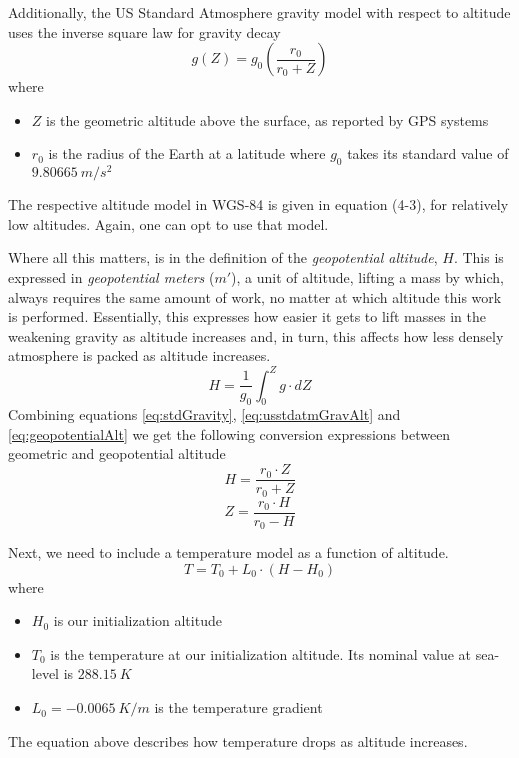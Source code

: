 Additionally, the US Standard Atmosphere gravity model with respect to altitude uses the inverse square law for gravity decay
\begin{equation} \label{eq:usstdatmGravAlt}
	g(Z) = g_0 \left(\frac{r_0}{r_0+Z}\right)
\end{equation}
where
\begin{itemize}
	\item $Z$ is the geometric altitude above the surface, as reported by GPS systems
	\item $r_0$ is the radius of the Earth at a latitude where $g_0$ takes its standard value of $9.80665~ m/s^2$
\end{itemize}
The respective altitude model in WGS-84 is given in equation (4-3), for relatively low altitudes. Again, one can opt to use that model.

Where all this matters, is in the definition of the \emph{geopotential altitude}, $H$. This is expressed in \emph{geopotential meters} ($m'$), a unit of altitude, lifting a mass by which, always requires the same amount of work, no matter at which altitude this work is performed. Essentially, this expresses how easier it gets to lift masses in the weakening gravity as altitude increases and, in turn, this affects how less densely atmosphere is packed as altitude increases.
\begin{equation} \label{eq:geopotentialAlt}
	H = \frac{1}{g_0}\int_{0}^{Z}g\cdot dZ
\end{equation}
Combining equations \ref{eq:stdGravity}, \ref{eq:usstdatmGravAlt} and \ref{eq:geopotentialAlt} we get the following conversion expressions between geometric and geopotential altitude
\begin{equation}
	H = \frac{r_0 \cdot Z}{r_0 + Z}
\end{equation}
\begin{equation}
	Z = \frac{r_0 \cdot H}{r_0 - H}
\end{equation}

Next, we need to include a temperature model as a function of altitude.
\begin{equation}
	T = T_0 + L_0 \cdot (H - H_0)
\end{equation}
where
\begin{itemize}
	\item $H_0$ is our initialization altitude
	\item $T_0$ is the temperature at our initialization altitude. Its nominal value at sea-level is $288.15~K$
	\item $L_0 = -0.0065~K/m$ is the temperature gradient
\end{itemize}
The equation above describes how temperature drops as altitude increases.

